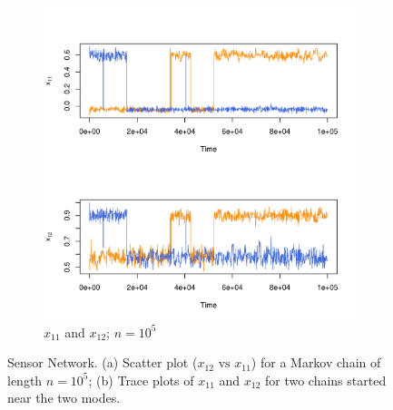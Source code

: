 \documentclass[11pt]{article}
\theoremstyle{remark}
\begin{document}
\begin{figure}[h]
\begin{subfigure}[h]{0.5\textwidth}
      \includegraphics[width = \textwidth]{plots/sensor-trace_loc1.pdf}
      \caption{$x_{11}$ and $x_{12}$; $n=10^5$}
      \label{subfig:sensor-trace_loc1}
    \end{subfigure}
    \caption{Sensor Network. (a) Scatter plot ($x_{12} \textrm{ vs } x_{11}$) for a Markov chain of length $n=10^5$; (b) Trace plots  of $x_{11}$ and $x_{12}$ for two chains started near the two modes.}
    \label{fig:sensor-sp_n_tarce}
\end{figure}
\end{document}
